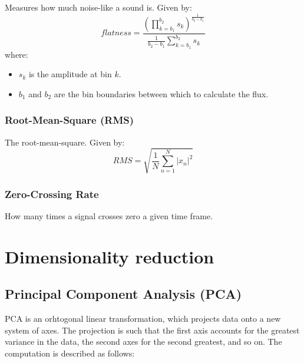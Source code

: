 \documentclass[a4paper, 12pt, twoside]{report}
\begin{document}
    Measures how much noise-like a sound is. Given by:
        \[ flatness = \frac{(\prod^{b_{2}}_{k=b_{1}}s_{k})^{\frac{1}{b_{2}-b_{1}}}}{\frac{1}{b_{2}-b_{1}}\sum^{b_{2}}_{k=b_{1}}s_{k}} \]
    where:
    \begin{itemize}
      \item $s_{k}$ is the amplitude at bin $k$.
      \item $b_{1}$ and $b_{2}$ are the bin boundaries between which to calculate the flux.
    \end{itemize}
\subsubsection{Root-Mean-Square (RMS)}
\label{sec:orgb1f5108}

    The root-mean-square. Given by:
    \[ RMS = \sqrt{\frac{1}{N}\sum^{N}_{n=1}|x_{n}|^{2}}\]

\subsubsection{Zero-Crossing Rate }
\label{sec:org7b27629}

    How many times a signal crosses zero a given time frame.
\section{Dimensionality reduction}
\label{sec:orgb502774}
\subsection{Principal Component Analysis (PCA)}
\label{sec:org93f3c9b}

PCA is an orhtogonal linear transformation, which projects data onto a new system of axes. The projection is such that the first axis accounts for the greatest variance in the data, the second axes for the second greatest, and so on. The computation is described as follows:
\end{document}
